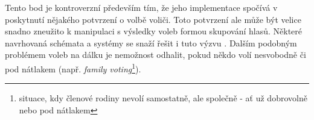 Tento bod je kontroverzní především tím, že jeho implementace spočívá v poskytnutí nějakého potvrzení o volbě voliči. Toto potvrzení ale může být velice snadno zneužito k manipulaci s výsledky voleb formou skupování hlasů. Některé navrhovaná schémata a systémy se snaží řešit i tuto výzvu \cite{receiptFree}. Dalším podobným problémem voleb na dálku je nemožnost odhalit, pokud někdo volí nesvobodně či pod nátlakem (např. \textit{family voting}\footnote{situace, kdy členové rodiny nevolí samostatně, ale společně - ať už dobrovolně nebo pod nátlakem}).